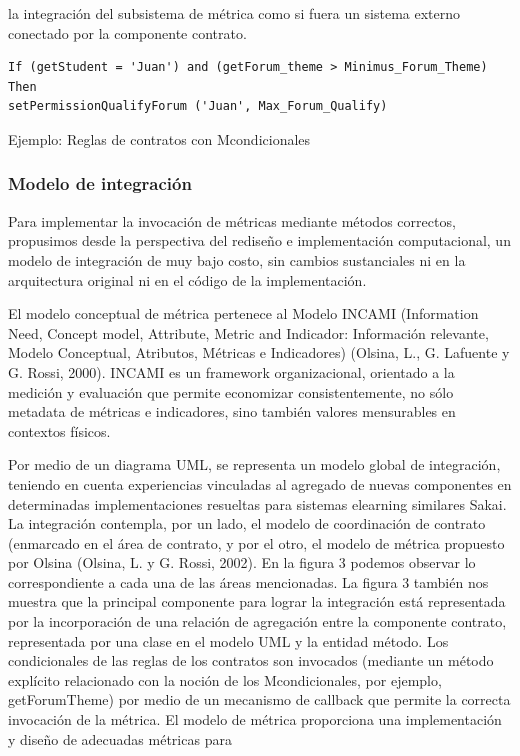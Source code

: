la integración del subsistema de métrica como si fuera un sistema externo
conectado por la componente contrato.


\begin{verbatim}
If (getStudent = 'Juan') and (getForum_theme > Minimus_Forum_Theme)
Then
setPermissionQualifyForum ('Juan', Max_Forum_Qualify)
\end{verbatim} 
\caption {Ejemplo: Reglas de contratos con Mcondicionales}


\subsubsection {Modelo de integración}

Para implementar la invocación de métricas mediante métodos correctos, propusimos
desde la perspectiva del rediseño e implementación computacional,
un modelo de integración de muy bajo costo, sin cambios sustanciales ni en la
arquitectura original ni en el código de la implementación.

El modelo conceptual de métrica pertenece al Modelo INCAMI (Information Need, Concept model, Attribute, Metric and Indicador: Información relevante, Modelo Conceptual, Atributos, Métricas e Indicadores) (Olsina, L., G. Lafuente y G. Rossi, 2000). INCAMI es un framework organizacional, orientado a la medición y evaluación que permite economizar consistentemente, no sólo metadata de métricas e indicadores, sino también valores mensurables en contextos físicos.


Por medio de un diagrama UML, se representa un modelo global de integración, teniendo en cuenta experiencias vinculadas al agregado de nuevas componentes en determinadas implementaciones resueltas para sistemas elearning similares Sakai. La integración contempla, por un lado, el modelo de coordinación de contrato (enmarcado en el área de contrato, y por el otro, el modelo de métrica propuesto por Olsina (Olsina, L. y G. Rossi, 2002). En la figura 3 podemos observar lo correspondiente a cada una de las áreas mencionadas. La figura 3 también nos muestra que la principal componente para lograr la integración está representada por la incorporación de una relación de agregación entre la componente contrato, representada por una clase en el modelo UML y la entidad método. Los condicionales de las reglas de los contratos son
invocados (mediante un método explícito relacionado con la noción de los
Mcondicionales, por ejemplo, getForumTheme) por medio de un mecanismo
de callback que permite la correcta invocación de la métrica. El modelo de
métrica proporciona una implementación y diseño de adecuadas métricas para

